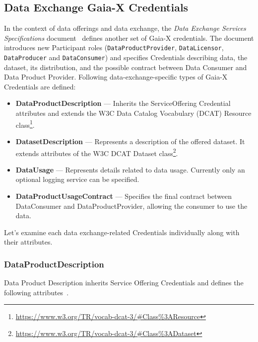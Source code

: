 \subsection{Data Exchange Gaia-X Credentials}\label{subsec:data-exchange-gaia-x-credentials}

In the context of data offerings and data exchange, the \textit{Data Exchange Services Specifications} document~\cite{gaiax_data_exchange_document} defines another set of Gaia-X credentials.
The document introduces new Participant roles (\texttt{DataProductProvider}, \texttt{DataLicensor}, \texttt{DataProducer} and \texttt{DataConsumer}) and specifies Credentials describing data, the dataset, its distribution, and the possible contract between Data Consumer and Data Product Provider.
Following data-exchange-specific types of Gaia-X Credentials are defined:
\begin{itemize}
    \item \textbf{DataProductDescription} --- Inherits the ServiceOffering Credential attributes and extends the W3C Data Catalog Vocabulary (DCAT) Resource class\footnote{\url{https://www.w3.org/TR/vocab-dcat-3/\#Class\%3AResource}}.
    \item \textbf{DatasetDescription} --- Represents a description of the offered dataset.
    It extends attributes of the W3C DCAT Dataset class\footnote{\url{https://www.w3.org/TR/vocab-dcat-3/\#Class\%3ADataset}}.
    \item \textbf{DataUsage} --- Represents details related to data usage.
    Currently only an optional logging service can be specified.
    \item \textbf{DataProductUsageContract} --- Specifies the final contract between DataConsumer and DataProductProvider, allowing the consumer to use the data.
\end{itemize}

Let's examine each data exchange-related Credentials individually along with their attributes.

\subsubsection{DataProductDescription}

Data Product Description inherits Service Offering Credentials and defines the following attributes~\cite{gaiax_data_exchange_document}.

